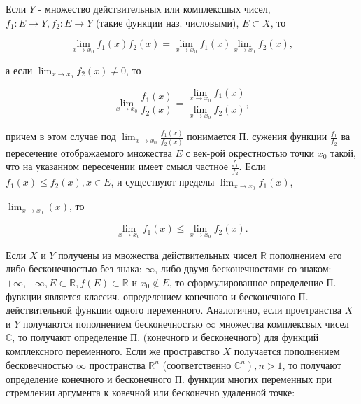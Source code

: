 \documentclass[10pt]{article}
\begin{document}
Если $Y$ - множество действительных или комплексшых чисел, $f_{1}: E \rightarrow Y, f_{2}: E \rightarrow Y$ (такие функции наз. числовыми), $E \subset X$, то



\[

\lim _{x \rightarrow x_{0}} f_{1}(x) f_{2}(x)=\lim _{x \rightarrow x_{0}} f_{1}(x) \lim _{x \rightarrow x_{0}} f_{2}(x),

\]



а если $\lim _{x \rightarrow x_{0}} f_{2}(x) \neq 0$, то



\[

\lim _{x \rightarrow x_{0}} \frac{f_{1}(x)}{f_{2}(x)}=\frac{\lim _{x \rightarrow x_{0}} f_{1}(x)}{\lim _{x \rightarrow x_{0}} f_{2}(x)},

\]



причем в этом случае под $\lim _{x \rightarrow x_{0}} \frac{f_{1}(x)}{f_{2}(x)}$ понимается П. сужения функции $\frac{f_{1}}{f_{2}}$ ва пересечение отображаемого множества $E$ с век-рой окрестностью точки $x_{0}$ такой, что на указанном пересечении имеет смысл частное $\frac{f_{1}}{f_{2}}$. Если $f_{1}(x) \leqslant f_{2}(x), x \in E$, и существуют пределы $\lim _{x \rightarrow x_{0}} f_{1}(x)$,

$\lim _{x \rightarrow x_{0}}(x)$, то



\[

\lim _{x \rightarrow x_{0}} f_{1}(x) \leqslant \lim _{x \rightarrow x_{0}} f_{2}(x) .

\]



Если $X$ и $Y$ получены из мвожества действительных чисел $\mathbb{R}$ пополнением его либо бесконечностью без знака: $\infty$, либо двумя бесконечностями со знаком: $+\infty,-\infty, E \subset \mathbb{R}, f(E) \subset \mathbb{R}$ и $x_{0} \notin E$, то сформулированное определение П. фувкции является классич. определением конечного и бесконечного П. действительной функции одного переменного. Аналогично, если проетранства $X$ и $Y$ получаются пополнением бесконечностью $\infty$ множества комплексвых чисел $\mathbb{C}$, то получают определение П. (конечного и бесконечного) для функций комплексного переменного. Если же простравство $X$ получается пополнением бесковечностью $\infty$ пространства $\mathbb{R}^{n}$ (соответственно $\left.\mathbb{C}^{n}\right), n>1$, то получают определение конечного и бесконечного П. функции многих переменных при стремлении аргумента к ковечной или бесконечно удаленной точке:
\end{document}
